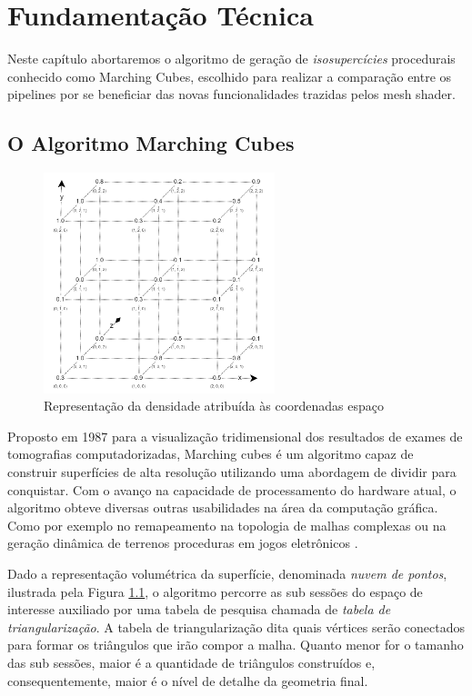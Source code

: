 \chapter{Fundamentação Técnica}\label{chp:LABEL_CASOS_DE_ESTUDOS}

Neste capítulo abortaremos o algoritmo de geração de \textit{isosupercícies} procedurais conhecido como Marching Cubes, escolhido para realizar a comparação entre os pipelines por se beneficiar das novas funcionalidades trazidas pelos mesh shader.

\section{O Algoritmo Marching Cubes}\label{sec:LABEL_CASOS_DE_ESTUDOS_SEC_A}

\begin{figure}
\centering
\includegraphics[width=0.6\textwidth]{imagens/MarchingCubes-NuvemDensidade.png}
\caption{Representação da densidade atribuída às coordenadas espaço}
\label{fig:LABEL_FIG_NUVEM_DENSIDADE}
\end{figure}

Proposto em 1987 para a visualização tridimensional dos resultados de exames de tomografias computadorizadas, Marching cubes \cite{REF_ART_MARCHING_CUBES} é um algoritmo capaz de construir superfícies de alta resolução utilizando uma abordagem de dividir para conquistar. Com o avanço na capacidade de processamento do hardware atual, o algoritmo obteve diversas outras usabilidades na área da computação gráfica. Como por exemplo no remapeamento na topologia de malhas complexas \cite{REF_ART_MARCHING_CUBES_REMESH} ou na geração dinâmica de terrenos proceduras em jogos eletrônicos \cite{REF_ART_MARCHING_CUBES_TERRAIN_GENERATION}.


Dado a representação volumétrica da superfície, denominada \textit{nuvem de pontos}, ilustrada pela Figura \ref{fig:LABEL_FIG_NUVEM_DENSIDADE}, o algoritmo percorre as sub sessões do espaço de interesse auxiliado por uma tabela de pesquisa chamada de \textit{tabela de triangularização}. A tabela de triangularização dita quais vértices serão conectados para formar os triângulos que irão compor a malha. Quanto menor for o tamanho das sub sessões, maior é a quantidade de triângulos construídos e, consequentemente, maior é o nível de detalhe da geometria final. 

